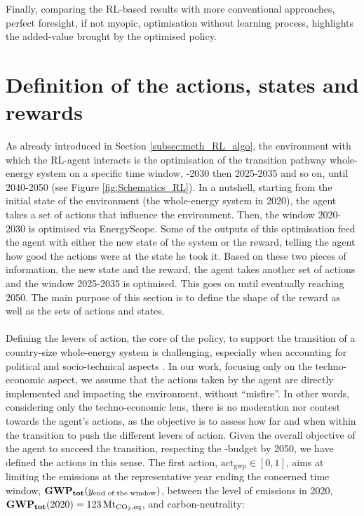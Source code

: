 Finally, comparing the \gls{RL}-based results with more conventional approaches, \ie perfect foresight, if not myopic, optimisation without learning process, highlights the added-value brought by the optimised policy.


\section{Definition of the actions, states and rewards}
\label{sec:RL:act_states_rew}
As already introduced in Section \ref{subsec:meth_RL_algo}, the environment with which the \gls{RL}-agent interacts is the optimisation of the transition pathway whole-energy system on a specific time window, -2030 then 2025-2035 and so on, until 2040-2050 (see Figure \ref{fig:Schematics_RL}). In a nutshell, starting from the initial state of the environment (\ie the whole-energy system in 2020), the agent takes a set of actions that influence the environment. Then, the window 2020-2030 is optimised via EnergyScope. Some of the outputs of this optimisation feed the agent with either the new state of the system or the reward, \ie telling the agent how good the actions were at the state he took it. Based on these two pieces of information, \ie the new state and the reward, the agent takes another set of actions and the window 2025-2035 is optimised. This goes on until eventually reaching 2050.  The main purpose of this section is to define the shape of the reward as well as the sets of actions and states.\\


\\

\noindent
Defining the levers of action, the core of the policy, to support the transition of a country-size whole-energy system is challenging, especially when accounting for political and socio-technical aspects \cite{castrejon2020making}. In our work, focusing only on the techno-economic aspect, we assume that the actions taken by the agent are directly implemented and impacting the environment, without ``misfire''. In other words, considering only the techno-economic lens, there is no moderation nor contest towards the agent's actions, as the objective is to assess how far and when within the transition to push the different levers of action. Given the overall objective of the agent to succeed the transition, \ie respecting the -budget by 2050, we have defined the actions in this sense. The first action, $\mathrm{act}_{\mathrm{gwp}} \in [0,1]$, aims at limiting the emissions at the representative year ending the concerned time window, $\textbf{GWP\textsubscript{tot}}(y_{\text{end of the window}})$, between the level of emissions in 2020, \ie $\textbf{GWP\textsubscript{tot}}(2020)=123\,\text{Mt}_{\ce{CO2},\text{eq}}$, and carbon-neutrality:

